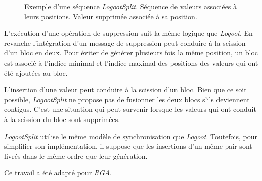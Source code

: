 \begin{figure}[tb]
\centering
\begin{subfigure}[b]{0.69\linewidth}
    \centering
    \caption{}\label{fig:logootsplit-1}
\end{subfigure}
\begin{subfigure}[b]{0.29\linewidth}
    \centering
    \caption{}\label{fig:logootsplit-2}
\end{subfigure}
\caption[Exemple d'une séquence \emph{LogootSplit}]{Exemple d'une séquence \emph{LogootSplit}.
 Séquence de valeurs associées à leurs positions.
 Valeur supprimée associée à sa position.}\label{fig:logootsplit}
\end{figure}

L'exécution d'une opération de suppression suit la même logique que \emph{Logoot}.
En revanche l'intégration d'un message de suppression peut conduire à la scission d'un bloc en deux.
Pour éviter de générer plusieurs fois la même position, un bloc est associé à l'indice minimal et l'indice maximal des positions des valeurs qui ont été ajoutées au bloc.

L'insertion d'une valeur peut conduire à la scission d'un bloc.
Bien que ce soit possible, \emph{LogootSplit} ne propose pas de fusionner les deux blocs s'ils deviennent contigus.
C'est une situation qui peut survenir lorsque les valeurs qui ont conduit à la scission du bloc sont supprimées.

\emph{LogootSplit} utilise le même modèle de synchronisation que \emph{Logoot}.
Toutefois, pour simplifier son implémentation, il suppose que les insertions d'un même pair sont livrés dans le même ordre que leur génération.

Ce travail a été adapté pour \emph{RGA}\autocite{briot_2016_rgasplit}.



